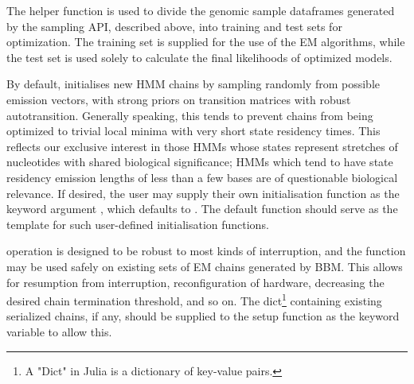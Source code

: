 The helper function  is used to divide the genomic sample dataframes generated by the sampling API, described above, into training and test sets for optimization. The training set is supplied for the use of the EM algorithms, while the test set is used solely to calculate the final likelihoods of optimized models.

By default,  initialises new HMM chains by sampling randomly from possible emission vectors, with strong priors on transition matrices with robust autotransition. Generally speaking, this tends to prevent chains from being optimized to trivial local minima with very short state residency times. This reflects our exclusive interest in those HMMs whose states represent stretches of nucleotides with shared biological significance; HMMs which tend to have state residency emission lengths of less than a few bases are of questionable biological relevance. If desired, the user may supply their own initialisation function as the  keyword argument , which defaults to . The default function should serve as the template for such user-defined initialisation functions.

 operation is designed to be robust to most kinds of interruption, and the  function may be used safely on existing sets of EM chains generated by BBM. This allows for resumption from interruption, reconfiguration of hardware, decreasing the desired chain termination threshold, and so on. The dict\footnote{A "Dict" in Julia is a dictionary of key-value pairs.} containing existing serialized chains, if any, should be supplied to the setup function as the  keyword variable to allow this.

